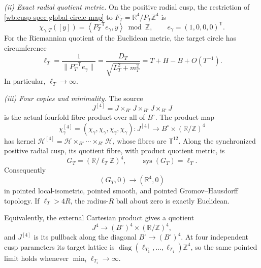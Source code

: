 \begin{theorem}
\smallskip
\noindent
\emph{(ii) Exact radial quotient metric.}
On the positive radial cusp, the restriction of
\cref{wb:cusp-spec-global-circle-map} to
\(F_T=\mathbb R^4/P_T\mathbb Z^4\) is
\begin{equation}
 \chi_{\gamma,T}([y])
 =\left\langle P_T^{-\mathsf T}e_\gamma,y\right\rangle
   \bmod\mathbb Z,\qquad e_\gamma=(1,0,0,0)^{\mathsf T}.
 \label{wb:cusp-spec-radial-circle-character}
\end{equation}
For the Riemannian quotient of the Euclidean metric, the target circle has
circumference
\begin{equation}
 \ell_T
 =\frac1{\lVert P_T^{-\mathsf T}e_\gamma\rVert}
 =\frac{D_T}{\sqrt{L_T^2+m_T^2}}
 =T+H-B+O(T^{-1}).
 \label{wb:cusp-spec-global-circle-circumference}
\end{equation}
In particular, \(\ell_T\to\infty\).

\smallskip
\noindent
\emph{(iii) Four copies and minimality.}
The source
\begin{equation}
 J^{[4]}=J\times_{B^\circ}J\times_{B^\circ}J\times_{B^\circ}J
 \label{wb:cusp-spec-fourfold-fibre-product}
\end{equation}
is the actual fourfold fibre product over all of \(B^\circ\).  The product
map
\begin{equation}
 \chi_\gamma^{[4]}=(\chi_\gamma,\chi_\gamma,\chi_\gamma,\chi_\gamma):
 J^{[4]}\longrightarrow B^\circ\times(\mathbb R/\mathbb Z)^4
 \label{wb:cusp-spec-fourfold-circle-map}
\end{equation}
has kernel
\(\mathcal H^{[4]}=\mathcal H\times_{B^\circ}\cdots
\times_{B^\circ}\mathcal H\), whose fibres are
\(\mathbb T^{12}\).  Along the synchronized positive
radial cusp, its quotient fibre, with product quotient metric, is
\begin{equation}
 G_T=(\mathbb R/\ell_T\mathbb Z)^4,\qquad
 \operatorname{sys}(G_T)=\ell_T.
 \label{wb:cusp-spec-four-circle-fibre}
\end{equation}
Consequently
\begin{equation}
 (G_T,0)\longrightarrow(\mathbb R^4,0)
 \label{wb:cusp-spec-four-circle-limit}
\end{equation}
in pointed local-isometric, pointed smooth, and pointed
Gromov--Hausdorff topology.  If \(\ell_T>4R\), the radius-\(R\) ball
about zero is exactly Euclidean.

Equivalently, the external Cartesian product gives a quotient
\[
 J^4\longrightarrow(B^\circ)^4\times(\mathbb R/\mathbb Z)^4,
\]
and \(J^{[4]}\) is its pullback along the diagonal
\(B^\circ\to(B^\circ)^4\).  At four independent cusp parameters its target
lattice is
\(\operatorname{diag}(\ell_{T_1},\ldots,\ell_{T_4})\mathbb Z^4\), so the
same pointed limit holds whenever
\(\min_i\ell_{T_i}\to\infty\).


\end{theorem}

